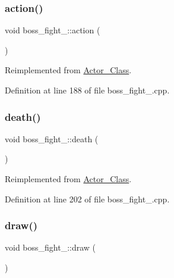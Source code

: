 \subsubsection{\texorpdfstring{action()}{action()}}
{\footnotesize\ttfamily void boss\+\_\+fight\+\_\+::action (\begin{DoxyParamCaption}{ }\end{DoxyParamCaption})\hspace{0.3cm}{\ttfamily [virtual]}}



Reimplemented from \hyperlink{class_actor___class_ab8e23ffae108da3b8eda67c6753bdae0}{Actor\+\_\+\+Class}.



Definition at line 188 of file boss\+\_\+fight\+\_.\+cpp.

\hypertarget{classboss__fight__3_a48e73e4ae1484663a108df1f420b8d9e}{}\label{classboss__fight__3_a48e73e4ae1484663a108df1f420b8d9e} 
\subsubsection{\texorpdfstring{death()}{death()}}
{\footnotesize\ttfamily void boss\+\_\+fight\+\_\+::death (\begin{DoxyParamCaption}{ }\end{DoxyParamCaption})\hspace{0.3cm}{\ttfamily [virtual]}}



Reimplemented from \hyperlink{class_actor___class_a9447c6154a674d7e6bdf24ff2874b7a8}{Actor\+\_\+\+Class}.



Definition at line 202 of file boss\+\_\+fight\+\_.\+cpp.

\hypertarget{classboss__fight__3_adcab7141b564704e89778a3303d529a7}{}\label{classboss__fight__3_adcab7141b564704e89778a3303d529a7} 
\subsubsection{\texorpdfstring{draw()}{draw()}}
{\footnotesize\ttfamily void boss\+\_\+fight\+\_\+::draw (\begin{DoxyParamCaption}{ }\end{DoxyParamCaption})\hspace{0.3cm}{\ttfamily [virtual]}}



